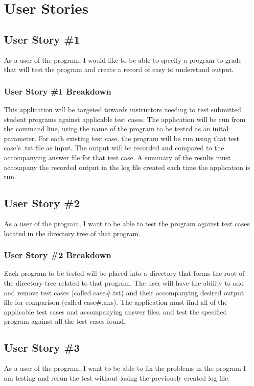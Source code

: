 \section{User Stories}


\subsection{User Story \#1}
As a user of the program, I would like to be able to specify a program to grade that will test the program and create a record of easy to understand output.

\subsubsection{User Story \#1 Breakdown}
This application will be targeted towards instructors needing to test submitted student programs against applicable test
cases.  The application will be run from the command line, using the name of the program to be tested as an inital parameter.
For each existing test case, the program will be run using that test case's .tst file as input.  The output will be recorded and 
compared to the accompanying answer file for that test case.  A summary of the results must accompany the recorded
output in the log file created each time the application is run.

\subsection{User Story \#2} 

As a user of the program, I want to be able to test the program against test cases located in the directory tree of that program. 


\subsubsection{User Story \#2 Breakdown}
Each program to be tested will be placed into a directory that forms the root of the directory tree related to that program.
The user will have the ability to add and remove test cases  (called case\#.tst) and their accompanying desired output file
for comparison (called case\#.ans).  The application must find all of the applicable test cases and accompanying answer 
files, and test the specified program against all the test cases found.

\subsection{User Story \#3} 
As a user of the program, I want to be able to fix the problems in the program I am testing and rerun the test without losing
the previously created log file.

